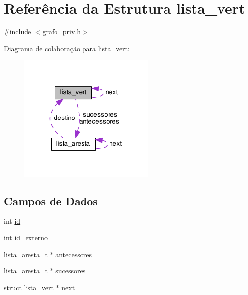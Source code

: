 \hypertarget{structlista__vert}{}\section{Referência da Estrutura lista\+\_\+vert}
\label{structlista__vert}


{\ttfamily \#include $<$grafo\+\_\+priv.\+h$>$}



Diagrama de colaboração para lista\+\_\+vert\+:\nopagebreak
\begin{figure}[H]
\begin{center}
\leavevmode
\includegraphics[width=190pt]{structlista__vert__coll__graph}
\end{center}
\end{figure}
\subsection*{Campos de Dados}
\begin{DoxyCompactItemize}
\item 
int \hyperlink{structlista__vert_acce74c81e9c5ed24ff7bc175e22a7079}{id}
\item 
int \hyperlink{structlista__vert_a4741315d4db64dad0ee3b59d8f5a4951}{id\+\_\+externo}
\item 
\hyperlink{grafo__priv_8h_a8c99b03365ae7f753c4cf1a20d9e9257}{lista\+\_\+aresta\+\_\+t} $\ast$ \hyperlink{structlista__vert_a39a423ac0ec49cb5bcca3c73c353db19}{antecessores}
\item 
\hyperlink{grafo__priv_8h_a8c99b03365ae7f753c4cf1a20d9e9257}{lista\+\_\+aresta\+\_\+t} $\ast$ \hyperlink{structlista__vert_ac003e2d2beffcf2432cac5460cf82263}{sucessores}
\item 
struct \hyperlink{structlista__vert}{lista\+\_\+vert} $\ast$ \hyperlink{structlista__vert_a772eebf412b0d7e40a73f5989e6a1835}{next}
\end{DoxyCompactItemize}


